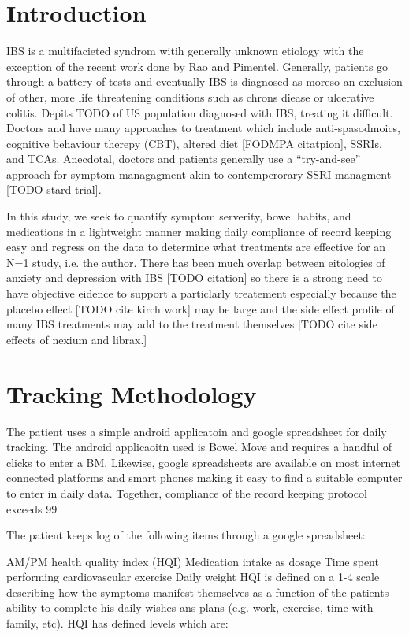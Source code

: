 \documentclass[conference]{IEEEtran}
\begin{document}
\section{Introduction}
IBS is a multifacieted syndrom witih generally unknown etiology with the exception of the recent work done by Rao and Pimentel.  Generally, patients go through a battery of tests and eventually IBS is diagnosed as moreso an exclusion of other, more life threatening conditions such as chrons diease or ulcerative colitis.   Depits TODO of US population diagnosed with IBS, treating it difficult.  Doctors and have many approaches to treatment which include anti-spasodmoics, cognitive behaviour therepy (CBT), altered diet [FODMPA citatpion], SSRIs, and TCAs. Anecdotal, doctors and patients generally use a “try-and-see” approach for symptom managagment akin to contemperorary SSRI managment [TODO stard trial].

In this study, we seek to quantify symptom serverity, bowel habits, and medications in a lightweight manner making daily compliance of record keeping easy and regress on the data to determine what treatments are effective for an N=1 study, i.e. the author.  There has been much overlap between eitologies of anxiety and depression with IBS [TODO citation] so there is a strong need to have objective eidence to support a particlarly treatement especially because the placebo effect [TODO cite kirch work] may be large and the side effect profile of many IBS treatments may add to the treatment themselves [TODO cite side effects of nexium and librax.]

\section{Tracking Methodology}

The patient uses a simple android applicatoin and google spreadsheet for daily tracking.  The android applicaoitn used is Bowel Move and requires a handful of clicks to enter a BM.  Likewise, google spreadsheets are available on most internet connected platforms and smart phones making it easy to find a suitable computer to enter in daily data.  Together, compliance of the record keeping protocol exceeds 99%

The patient keeps log of the following items through a google spreadsheet:

AM/PM health quality index (HQI)
Medication intake as dosage
Time spent performing cardiovascular exercise
Daily weight
HQI is defined on a 1-4 scale describing how the symptoms manifest themselves as a function of the patients ability to complete his daily wishes ans plans (e.g. work, exercise, time with family, etc).  HQI has defined levels which are:
\end{document}
